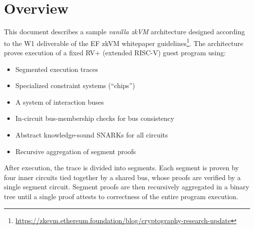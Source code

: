 \section*{Overview}

This document describes a sample \emph{vanilla zkVM} architecture designed according to the W1 deliverable of the EF zkVM whitepaper guidelines\footnote{\url{https://zkevm.ethereum.foundation/blog/cryptography-research-update}}.
The architecture proves execution of a fixed RV+ (extended RISC-V) guest program using:

\begin{itemize}
\item Segmented execution traces
\item Specialized constraint systems (``chips'')
\item A system of interaction buses
\item In-circuit bus-membership checks for bus consistency
\item Abstract knowledge-sound SNARKs for all circuits
\item Recursive aggregation of segment proofs
\end{itemize}

After execution, the trace is divided into segments. Each segment is proven by four inner circuits tied together by a shared bus, whose proofs are verified by a single segment circuit. Segment proofs are then recursively aggregated in a binary tree until a single proof attests to correctness of the entire program execution.


